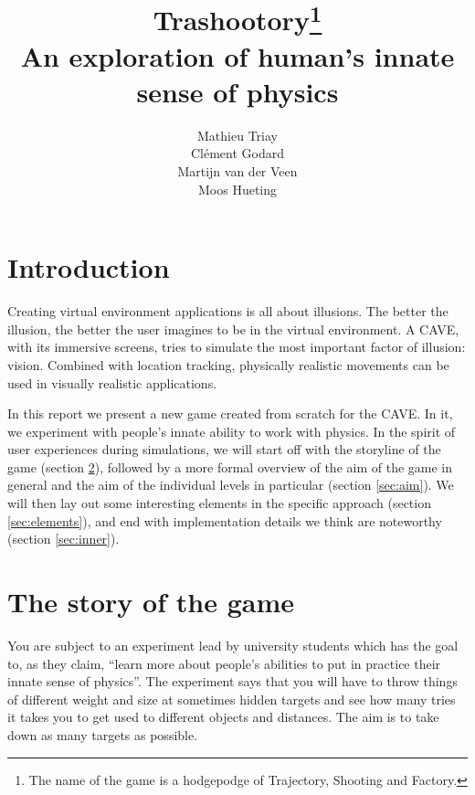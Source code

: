 \documentclass[a4paper]{article}
\title{Trashootory\footnote{The name of the game is a hodgepodge of Trajectory, Shooting and Factory.} \\ An exploration of human's innate sense of physics}
\author{Mathieu Triay \\ Cl\'ement Godard \\ Martijn van der Veen \\ Moos
Hueting}
\begin{document}
\maketitle

\tableofcontents
\pagebreak



\section{Introduction}
Creating virtual environment applications is all about illusions. The better the
illusion, the better the user imagines to be in the virtual environment. A CAVE, 
with its immersive screens, tries to simulate the most important factor of illusion: 
vision. Combined with location tracking, physically realistic movements can be used 
in visually realistic applications.

In this report we present a new game created from scratch for the CAVE. In it, we experiment
with people's innate ability to work with physics. In the spirit of user experiences during
simulations, we will start off with the storyline of the game (section \ref{sec:story}),
followed by a more formal overview of the aim of the game in general and the aim of the
individual levels in particular (section \ref{sec:aim}). We will then lay out some
interesting elements in the specific approach (section \ref{sec:elements}), and end with
implementation details we think are noteworthy (section \ref{sec:inner}).


\section{The story of the game}
\label{sec:story}
You are subject to an experiment lead by university students which has the goal to, as they claim, 
``learn more about people's abilities to put in practice their innate sense of
physics''. The experiment says that you will have to throw things of different
weight and size at sometimes hidden targets and see how many tries it takes you
to get used to different objects and distances. The aim is to take down as many
targets as possible.
\end{document}
